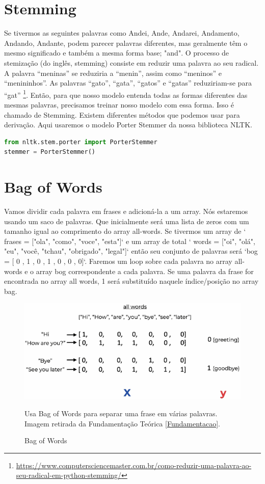 \section[Stemming]{Stemming}


Se tivermos as seguintes palavras como Andei, Ande, Andarei, Andamento, Andando, Andante, podem parecer palavras diferentes, mas geralmente têm o mesmo significado e também a mesma forma base; "and".
O processo de stemização (do inglês, stemming) consiste em reduzir uma palavra ao seu radical. A palavra “meninas” se reduziria a “menin”, assim como “meninos” e “menininhos”. As palavras “gato”, “gata”, “gatos” e “gatas” reduziriam-se para “gat” \footnote{\url{https://www.computersciencemaster.com.br/como-reduzir-uma-palavra-ao-seu-radical-em-python-stemming/}}.
Então, para que nosso modelo entenda todas as formas diferentes das mesmas palavras, precisamos treinar nosso modelo com essa forma. Isso é chamado de Stemming. Existem diferentes métodos que podemos usar para derivação. Aqui usaremos o modelo Porter Stemmer da nossa biblioteca NLTK.
\justifying
\begin{lstlisting}[language=Python, caption=Python Stemming]
from nltk.stem.porter import PorterStemmer
stemmer = PorterStemmer()
\end{lstlisting}

\section[Bag of Words]{Bag of Words}
Vamos dividir cada palavra em frases e adicioná-la a um array. Nós estaremos usando um saco de palavras. Que inicialmente será uma lista de zeros com um tamanho igual ao comprimento do array all-words. Se tivermos um array de ` frases = ["ola", "como", "voce", "esta"]` e um array de total ` words = ["oi", "olá", "eu", "você, "tchau", "obrigado", "legal"]` então seu conjunto de palavras será `bog = [ 0 , 1 , 0 , 1 , 0 , 0 , 0]`. Faremos um loop sobre cada palavra no array all-words e o array bog correspondente a cada palavra. Se uma palavra da frase for encontrada no array all words, 1 será substituído naquele índice/posição no array bag.
\justifying


\begin{figure}[H]
   \begin{center}
      \includegraphics[width=15cm]{img/bagofwords.png}
      \caption{Bag of Words} \label{BagofWords}
      \medskip
      \small
      Usa Bag of Words para separar uma frase em várias palavras. Imagem retirada da Fundamentação Teórica \ref{Fundamentacao}.
   \end{center}
\end{figure}


